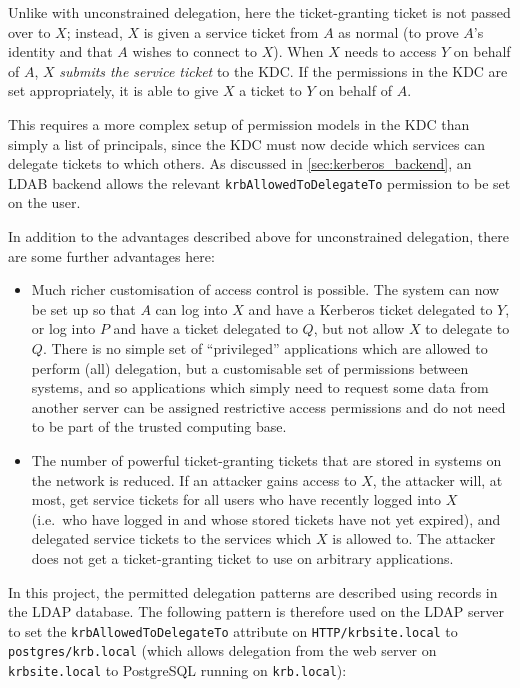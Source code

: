 \documentclass[12pt]{report}
\begin{document}
Unlike with unconstrained delegation, here the ticket-granting ticket is not passed over to $X$; instead, $X$ is given a service ticket from $A$ as normal (to prove $A$'s identity and that $A$ wishes to connect to $X$). When $X$ needs to access $Y$ on behalf of $A$, $X$ \textit{submits the service ticket} to the KDC. If the permissions in the KDC are set appropriately, it is able to give $X$ a ticket to $Y$ on behalf of $A$.

This requires a more complex setup of permission models in the KDC than simply a list of principals, since the KDC must now decide which services can delegate tickets to which others. As discussed in \autoref{sec:kerberos_backend}, an LDAB backend allows the relevant \texttt{krbAllowedToDelegateTo} permission to be set on the user\cite{KRB-DELEG}.

In addition to the advantages described above for unconstrained delegation, there are some further advantages here:

\begin{itemize}
\item
  Much richer customisation of access control is possible. The system can now be set up so that $A$ can log into $X$ and have a Kerberos ticket delegated to $Y$, or log into $P$ and have a ticket delegated to $Q$, but not allow $X$ to delegate to $Q$. There is no simple set of ``privileged'' applications which are allowed to perform (all) delegation, but a customisable set of permissions between systems, and so applications which simply need to request some data from another server can be assigned restrictive access permissions and do not need to be part of the trusted computing base.
\item
  The number of powerful ticket-granting tickets that are stored in systems on the network is reduced. If an attacker gains access to $X$, the attacker will, at most, get service tickets for all users who have recently logged into $X$ (i.e.\ who have logged in and whose stored tickets have not yet expired), and delegated service tickets to the services which $X$ is allowed to. The attacker does not get a ticket-granting ticket to use on arbitrary applications.
\end{itemize}

In this project, the permitted delegation patterns are described using records in the LDAP database. The following pattern is therefore used on the LDAP server to set the \texttt{krbAllowedToDelegateTo} attribute on \verb+HTTP/krbsite.local+ to \verb+postgres/krb.local+ (which allows delegation from the web server on \verb+krbsite.local+ to PostgreSQL running on \verb+krb.local+):
\end{document}
